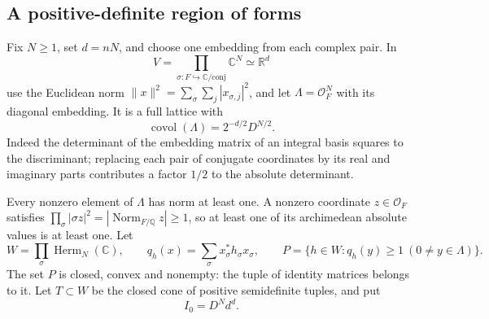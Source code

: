 \subsection{A positive-definite region of forms}
Fix \(N\geq1\), set \(d=nN\), and choose one embedding from each
complex pair. In
\[
 V=\prod_{\sigma:F\hookrightarrow\mathbb C/\mathrm{conj}}\mathbb C^N
                       \simeq\mathbb R^d
\]
use the Euclidean norm
\(\|x\|^2=\sum_\sigma\sum_j|x_{\sigma,j}|^2\), and let
\(\Lambda=\mathcal O_F^N\) with its diagonal embedding.
It is a full lattice with
\[
           \operatorname{covol}(\Lambda)=2^{-d/2}D^{N/2}.
\]
Indeed the determinant of the embedding matrix of an integral basis
squares to the discriminant; replacing each pair of conjugate
coordinates by its real and imaginary parts contributes a factor
\(1/2\) to the absolute determinant.

Every nonzero element of \(\Lambda\) has norm at least one.
A nonzero coordinate \(z\in\mathcal O_F\) satisfies
\(\prod_\sigma|\sigma z|^2=|\operatorname{Norm}_{F/\mathbb Q}z|\geq1\),
so at least one of its archimedean absolute values is at least one.
Let
\[
 W=\prod_\sigma\operatorname{Herm}_N(\mathbb C),\qquad
 q_h(x)=\sum_\sigma x_\sigma^*h_\sigma x_\sigma,\qquad
 P=\{h\in W:q_h(y)\geq1\ (0\ne y\in\Lambda)\}.
\]
The set \(P\) is closed, convex and nonempty: the tuple of identity
matrices belongs to it. Let \(T\subset W\) be the closed cone of
positive semidefinite tuples, and put
\[
 I_0=D^N d^d .
\]

